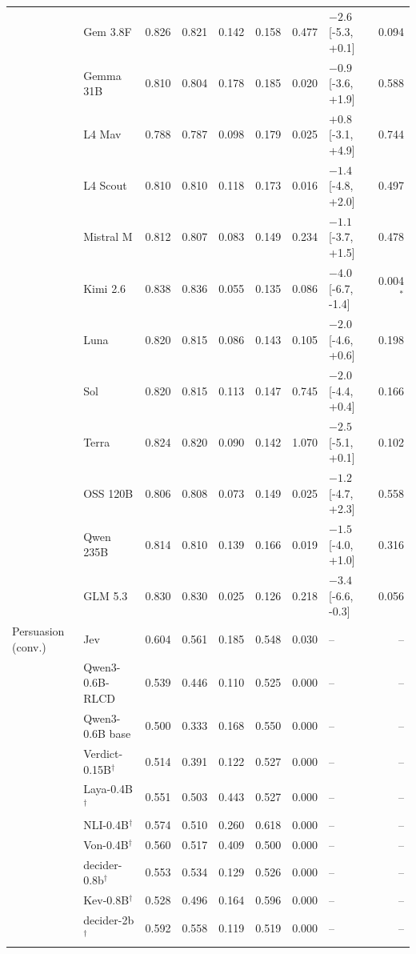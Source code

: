 \begin{longtable}{llrrrrrlr}
 & Gem 3.8F & 0.826 & 0.821 & 0.142 & 0.158 & 0.477 & $-2.6$ [-5.3, +0.1] & 0.094 \\
 & Gemma 31B & 0.810 & 0.804 & 0.178 & 0.185 & 0.020 & $-0.9$ [-3.6, +1.9] & 0.588 \\
 & L4 Mav & 0.788 & 0.787 & 0.098 & 0.179 & 0.025 & $+0.8$ [-3.1, +4.9] & 0.744 \\
 & L4 Scout & 0.810 & 0.810 & 0.118 & 0.173 & 0.016 & $-1.4$ [-4.8, +2.0] & 0.497 \\
 & Mistral M & 0.812 & 0.807 & 0.083 & 0.149 & 0.234 & $-1.1$ [-3.7, +1.5] & 0.478 \\
 & Kimi 2.6 & 0.838 & 0.836 & 0.055 & 0.135 & 0.086 & $-4.0$ [-6.7, -1.4] & 0.004$^{*}$ \\
 & Luna & 0.820 & 0.815 & 0.086 & 0.143 & 0.105 & $-2.0$ [-4.6, +0.6] & 0.198 \\
 & Sol & 0.820 & 0.815 & 0.113 & 0.147 & 0.745 & $-2.0$ [-4.4, +0.4] & 0.166 \\
 & Terra & 0.824 & 0.820 & 0.090 & 0.142 & 1.070 & $-2.5$ [-5.1, +0.1] & 0.102 \\
 & OSS 120B & 0.806 & 0.808 & 0.073 & 0.149 & 0.025 & $-1.2$ [-4.7, +2.3] & 0.558 \\
 & Qwen 235B & 0.814 & 0.810 & 0.139 & 0.166 & 0.019 & $-1.5$ [-4.0, +1.0] & 0.316 \\
 & GLM 5.3 & 0.830 & 0.830 & 0.025 & 0.126 & 0.218 & $-3.4$ [-6.6, -0.3] & 0.056 \\
\midrule
Persuasion (conv.) & Jev & 0.604 & 0.561 & 0.185 & 0.548 & 0.030 & -- & -- \\
 & Qwen3-0.6B-RLCD & 0.539 & 0.446 & 0.110 & 0.525 & 0.000 & -- & -- \\
 & Qwen3-0.6B base & 0.500 & 0.333 & 0.168 & 0.550 & 0.000 & -- & -- \\
 & Verdict-0.15B$^{\dagger}$ & 0.514 & 0.391 & 0.122 & 0.527 & 0.000 & -- & -- \\
 & Laya-0.4B$^{\dagger}$ & 0.551 & 0.503 & 0.443 & 0.527 & 0.000 & -- & -- \\
 & NLI-0.4B$^{\dagger}$ & 0.574 & 0.510 & 0.260 & 0.618 & 0.000 & -- & -- \\
 & Von-0.4B$^{\dagger}$ & 0.560 & 0.517 & 0.409 & 0.500 & 0.000 & -- & -- \\
 & decider-0.8b$^{\dagger}$ & 0.553 & 0.534 & 0.129 & 0.526 & 0.000 & -- & -- \\
 & Kev-0.8B$^{\dagger}$ & 0.528 & 0.496 & 0.164 & 0.596 & 0.000 & -- & -- \\
 & decider-2b$^{\dagger}$ & 0.592 & 0.558 & 0.119 & 0.519 & 0.000 & -- & -- \\

\end{longtable}
